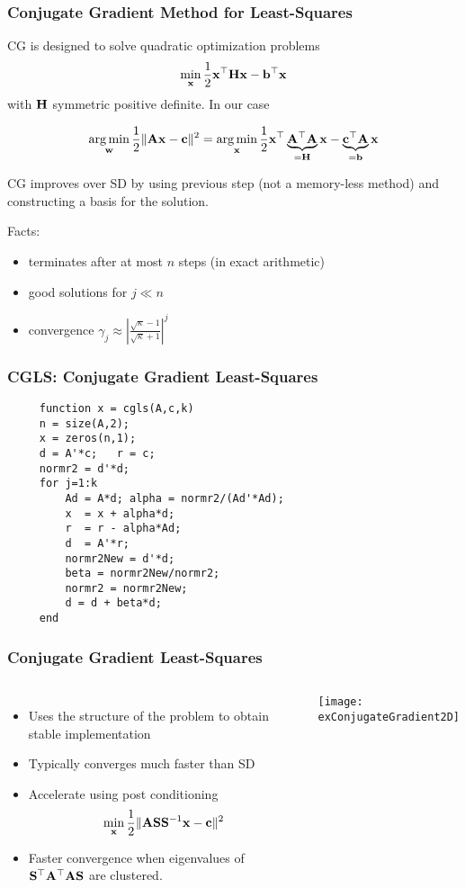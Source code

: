 \documentclass[12pt,fleqn]{beamer}
\begin{document}
\begin{frame}\frametitle{Conjugate Gradient Method for Least-Squares}

CG is designed to solve quadratic optimization problems 
$$\min_{\bf x} {\frac 12} {\bf x}^{\top} {\bf H} {\bf x} - {\bf b}^{\top} {\bf x}$$
with ${\bf H}$ symmetric positive definite. In our case

$$ \operatorname*{arg\,min}_{\bf w} {\frac 12} \|{\bf A}{\bf x} - {\bf c}\|^2 = \operatorname*{arg\,min}_{\bf x} {\frac 12} {\bf x}^{\top} \underbrace{{\bf A}^{\top}{\bf A}}_{={\bf H}} {\bf x} - \underbrace{{\bf c}^{\top}{\bf A}}_{={\bf b}}{\bf x} $$

\bigskip
 

CG improves over SD by using previous step (not a memory-less method) and constructing a basis for the solution.

\bigskip

Facts:
\begin{itemize}
	\item terminates after at most $n$ steps (in exact arithmetic)
	\item good solutions for $j\ll n$ 
	\item convergence
	$ \gamma_j \approx \left| {\frac {\sqrt{\kappa}-1}{\sqrt{\kappa}+1}} \right|^j $
\end{itemize}


\end{frame}

\begin{frame}[fragile]
	\frametitle{CGLS: Conjugate Gradient Least-Squares}
\begin{verbatim}
     function x = cgls(A,c,k)
     n = size(A,2);
     x = zeros(n,1);
     d = A'*c;   r = c;
     normr2 = d'*d;
     for j=1:k
         Ad = A*d; alpha = normr2/(Ad'*Ad);
         x  = x + alpha*d;
         r  = r - alpha*Ad;
         d  = A'*r;
         normr2New = d'*d;
         beta = normr2New/normr2;
         normr2 = normr2New;
         d = d + beta*d;
     end
\end{verbatim}



\end{frame}

\begin{frame}
	\frametitle{Conjugate Gradient Least-Squares}
\begin{columns}
	\begin{itemize}
	\item
	Uses the structure of the problem to obtain stable implementation
	\item
	Typically converges much faster than SD
	\item 
	Accelerate using post conditioning
	$$ \min_{\bf x} {\frac 12} \|{\bf A} {\bf S} {\bf S}^{-1} {\bf x} - {\bf c}\|^2$$
	\item 
	Faster convergence when eigenvalues of ${\bf S}^{\top} {\bf A}^{\top} {\bf A} {\bf S}$ are clustered.
	\end{itemize}
	
		
	\texttt{[image: exConjugateGradient2D]}
\end{columns}
\end{frame}
\end{document}
